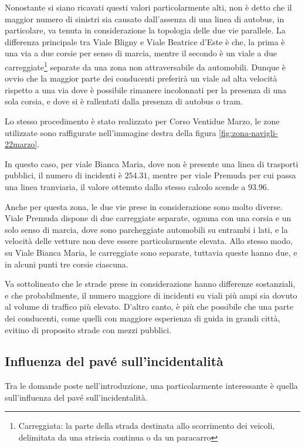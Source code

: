 \documentclass[a4paper,12pt]{report}
\newcommand{\skipline}{\vspace{0.2in}}
\begin{document}
\skipline
Nonostante si siano ricavati questi valori particolarmente alti, 
non è detto che il maggior numero di sinistri sia causato dall'assenza di una 
linea di autobus, 
in particolare, va tenuta in considerazione la topologia delle due vie parallele. 
La differenza principale tra Viale Bligny e Viale Beatrice d'Este è che, 
la prima è una via a due 
corsie per senso di marcia, mentre il secondo è un viale a due 
carreggiate\footnote{Carreggiata: la parte della strada destinata allo scorrimento dei veicoli, 
delimitata da una striscia continua o da un paracarro} 
separate da una zona non attraversabile da automobili. 
Dunque è ovvio che la maggior parte dei conducenti preferirà un viale ad alta velocità 
rispetto a una via dove è possibile rimanere incolonnati per la presenza di una sola 
corsia, e dove si è rallentati dalla presenza di autobus o tram. 

Lo stesso procedimento è stato realizzato per Corso Ventidue Marzo, le zone utilizzate sono 
raffigurate nell'immagine destra della figura \ref{fig:zona-navigli-22marzo}. 

In questo caso, per viale Bianca Maria, dove non è presente una linea di trasporti pubblici, 
il numero di incidenti è $254.31$, mentre per viale Premuda per cui passa una linea tranviaria, 
il valore ottenuto dallo stesso calcolo scende a $93.96$. 

Anche per questa zona, le due vie prese in considerazione sono molto diverse. 
Viale Premuda dispone di due carreggiate separate, ognuna con una corsia e un solo senso 
di marcia, dove sono parcheggiate automobili su entrambi i lati, e la velocità delle 
vetture non deve essere particolarmente elevata. 
Allo stesso modo, su Viale Bianca Maria, le carreggiate sono separate, tuttavia queste 
hanno due, e in alcuni punti tre corsie ciascuna. 

Va sottolineato che le strade prese in considerazione hanno differenze sostanziali, 
e che probabilmente, il numero maggiore di incidenti su viali più ampi sia dovuto al 
volume di traffico più elevato. 
D'altro canto, è più che possibile che una parte dei conducenti, 
come quelli con maggiore esperienza di guida in grandi città, evitino di proposito 
strade con mezzi pubblici.

\subsection{Influenza del pavé sull'incidentalità}

Tra le domande poste nell'introduzione, una particolarmente interessante è quella 
sull'influenza del pavé sull'incidentalità. 
\end{document}
